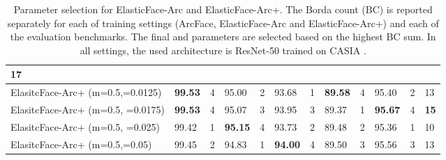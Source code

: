 \documentclass[letterpaper, 10 pt, conference]{ieeeconf}  \usepackage{times}
\begin{document}
\begin{table}[ht!]
{\begin{tabular}{|l|ll|ll|ll|ll|ll|l|}
  \textbf{17} \\ \hline \hline
ElasitcFace-Arc+ (m=0.5,=0.0125) &
  \multicolumn{1}{l|}{\textbf{99.53}} &
  4 &
  \multicolumn{1}{l|}{95.00} &
  2 &
  \multicolumn{1}{l|}{93.68} &
  1 &
  \multicolumn{1}{l|}{\textbf{89.58}} &
  4 &
  \multicolumn{1}{l|}{95.40} &
  2 &
  13 \\ \hline
ElasitcFace-Arc+ (m=0.5, =0.0175) &
  \multicolumn{1}{l|}{\textbf{99.53}} &
  4 &
  \multicolumn{1}{l|}{95.07} &
  3 &
  \multicolumn{1}{l|}{93.95} &
  3 &
  \multicolumn{1}{l|}{89.37} &
  1 &
  \multicolumn{1}{l|}{\textbf{95.67}} &
  4 &
  \textbf{15} \\ \hline
ElasitcFace-Arc+ (m=0.5, =0.025) &
  \multicolumn{1}{l|}{99.42} &
  1 &
  \multicolumn{1}{l|}{\textbf{95.15}} &
  4 &
  \multicolumn{1}{l|}{93.73} &
  2 &
  \multicolumn{1}{l|}{89.48} &
  2 &
  \multicolumn{1}{l|}{95.36} &
  1 &
  10 \\ \hline
ElasitcFace-Arc+ (m=0.5,=0.05) &
  \multicolumn{1}{l|}{99.45} &
  2 &
  \multicolumn{1}{l|}{94.83} &
  1 &
  \multicolumn{1}{l|}{\textbf{94.00}} &
  4 &
  \multicolumn{1}{l|}{89.50} &
  3 &
  \multicolumn{1}{l|}{95.56} &
  3 &
  13 \\ \hline
\end{tabular}}
\caption{Parameter selection for ElasticFace-Arc and ElasticFace-Arc+. 
The Borda count (BC) is reported separately for each of training settings (ArcFace, ElasticFace-Arc and ElasticFace-Arc+)  and each of the evaluation benchmarks.  The final  and  parameters are selected based on the highest BC sum.
In all settings, the used architecture is ResNet-50 trained on CASIA \cite{DBLP:journals/corr/YiLLL14a}.}
\label{tab:arc_param}
\end{table}
\end{document}

